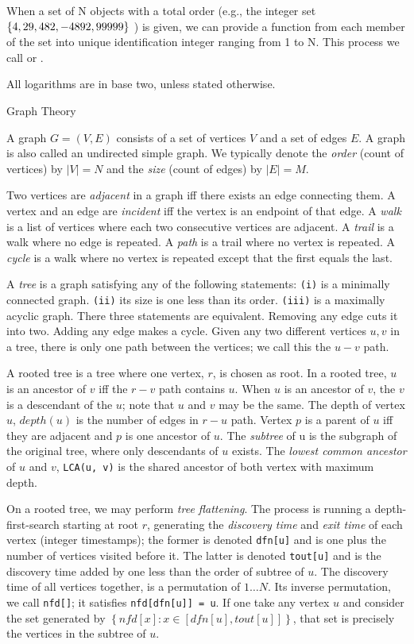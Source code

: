 When a set of N objects with a total order (e.g., the integer set $\{4, 29, 482, \penalty0 -4892, 99999\}$ ) is given, we can provide a function from each member of the set into unique identification integer ranging from 1 to N.  This process we call {\it {} } or {\it {} }.

All logarithms are in base two, unless stated otherwise.

\secc Graph Theory


A graph $G = (V, E)$ consists of a set of vertices $V$ and a set of edges $E$.
A graph is also called an undirected simple graph.  We typically denote the {\it order} (count of vertices) by $|V| = N$ and the {\it size} (count of edges) by $|E| = M$.

Two vertices are {\it adjacent} in a graph iff there exists an edge connecting them. A vertex and an edge are {\it incident} iff the vertex is an endpoint of that edge.
A {\it walk} is a list of vertices where each two consecutive vertices are adjacent.
A {\it trail} is a walk where no edge is repeated.  A {\it path} is a trail where no vertex is repeated.  A {\it cycle} is a walk where no vertex is repeated except that the first equals the last.

A {\it tree} is a graph satisfying any of the following statements: {\tt (i)} is a minimally connected graph.  {\tt (ii)} its size is one less than its order. {\tt (iii)} is a maximally acyclic graph.
There three statements are equivalent.  Removing any edge cuts it into two.  Adding any edge makes a cycle.  Given any two different vertices $u, v$ in a tree, there is only one path between the vertices; we call this the $u-v$ path.

A rooted tree is a tree where one vertex, $r$, is chosen as root.
In a rooted tree, $u$ is an ancestor of $v$ iff the $r-v$ path contains $u$.  When $u$ is an ancestor of $v$, the $v$ is a descendant of the $u$; note that $u$ and $v$ may be the same.  The depth of vertex $u$, $depth(u)$ is the number of edges in $r-u$ path.  Vertex $p$ is a parent of $u$ iff they are adjacent and $p$ is one ancestor of $u$.  The {\it subtree} of u is the subgraph of the original tree, where only descendants of $u$ exists.  The {\it lowest common ancestor} of $u$ and $v$, {\tt LCA(u, v)} is the shared ancestor of both vertex with maximum depth.



On a rooted tree, we may perform {\it tree flattening}.  The process is running a depth-first-search starting at root $r$, generating the {\it discovery time} and {\it exit time} of each vertex (integer timestamps); the former is denoted {\tt dfn[u]} and is one plus the number of vertices visited before it.  The latter is denoted {\tt tout[u]} and is the discovery time added by one less than the order of subtree of $u$.  The discovery time of all vertices together, is a permutation of $1 \dots N$.  Its inverse permutation, we call {\tt nfd[]}; it satisfies {\tt nfd[dfn[u]] = u}.  If one take any vertex $u$ and consider the set generated by $\left\{ nfd[x] : x \in [dfn[u], tout[u]] \right\}$, that set is precisely the vertices in the subtree of $u$.


